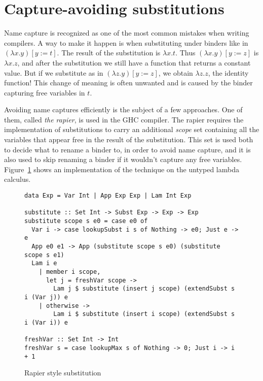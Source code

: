 \documentclass[acmtog, anonymous]{acmart}
\begin{document}
\section{Capture-avoiding substitutions}
\label{capture-avoiding-substitution}

Name capture is recognized as one of the most common mistakes when writing compilers.
A way to make it happen is when substituting under binders like in
$(\lambda x. y)[y:=t]$. The result of the substitution is $\lambda x. t$.
Thus $(\lambda x. y)[y:=z]$ is $\lambda x. z$, and after the substitution
we still have a function that returns a constant value. But if we substitute
as in $(\lambda z. y)[y:=z]$, we obtain $\lambda z. z$, the identity function!
This change of meaning is often unwanted and is caused by the binder capturing
free variables in $t$.

Avoiding name captures efficiently is the subject of a few approaches. One of them,
called \textit{the rapier}, is used in the GHC compiler. The rapier requires the
implementation of substitutions to carry an additional \textit{scope} set containing all the
variables that appear free in the result of the substitution. This set is
used both to decide what to rename a binder to, in order to avoid name capture,
and it is also used to skip renaming a binder if it wouldn't capture any free
variables. Figure~\ref{rapier-style-substitution} shows an implementation of the
technique on the untyped lambda calculus.

\begin{figure}
\begin{verbatim}
data Exp = Var Int | App Exp Exp | Lam Int Exp

substitute :: Set Int -> Subst Exp -> Exp -> Exp
substitute scope s e0 = case e0 of
  Var i -> case lookupSubst i s of Nothing -> e0; Just e -> e
  App e0 e1 -> App (substitute scope s e0) (substitute scope s e1)
  Lam i e
    | member i scope,
      let j = freshVar scope ->
        Lam j $ substitute (insert j scope) (extendSubst s i (Var j)) e
    | otherwise ->
        Lam i $ substitute (insert i scope) (extendSubst s i (Var i)) e

freshVar :: Set Int -> Int
freshVar s = case lookupMax s of Nothing -> 0; Just i -> i + 1
\end{verbatim}
\caption{Rapier style substitution}
\label{rapier-style-substitution}
\end{figure}
\end{document}
